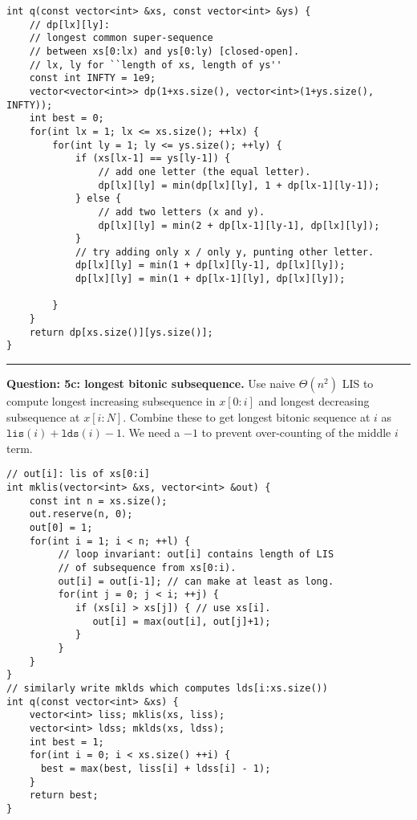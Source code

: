 \documentclass[14pt]{report}
\newcommand*{\question}[1]{\leavevmode\clearpage \par\noindent\rule{\textwidth}{0.4pt} \textbf{Question: #1.}}
\begin{document}
\begin{verbatim}
int q(const vector<int> &xs, const vector<int> &ys) {
    // dp[lx][ly]:
    // longest common super-sequence
    // between xs[0:lx) and ys[0:ly) [closed-open].
    // lx, ly for ``length of xs, length of ys''
    const int INFTY = 1e9;
    vector<vector<int>> dp(1+xs.size(), vector<int>(1+ys.size(), INFTY));
    int best = 0;
    for(int lx = 1; lx <= xs.size(); ++lx) {
        for(int ly = 1; ly <= ys.size(); ++ly) {
            if (xs[lx-1] == ys[ly-1]) {
                // add one letter (the equal letter).
                dp[lx][ly] = min(dp[lx][ly], 1 + dp[lx-1][ly-1]);
            } else {
                // add two letters (x and y).
                dp[lx][ly] = min(2 + dp[lx-1][ly-1], dp[lx][ly]);
            }
            // try adding only x / only y, punting other letter.
            dp[lx][ly] = min(1 + dp[lx][ly-1], dp[lx][ly]);
            dp[lx][ly] = min(1 + dp[lx-1][ly], dp[lx][ly]);

        }
    }
    return dp[xs.size()][ys.size()];
}
\end{verbatim}


\question{5c: longest bitonic subsequence}
Use naive $\Theta(n^2)$ LIS to compute longest increasing
subsequence in $x[0:i]$ and longest decreasing subsequence
at $x[i:N]$. Combine these to get longest bitonic
sequence at $i$ as $\texttt{lis}(i) + \texttt{lds}(i) - 1$.
We need a $-1$ to prevent over-counting of the middle $i$ term.

\begin{verbatim}
// out[i]: lis of xs[0:i]
int mklis(vector<int> &xs, vector<int> &out) {
    const int n = xs.size();
    out.reserve(n, 0);
    out[0] = 1;
    for(int i = 1; i < n; ++l) {
         // loop invariant: out[i] contains length of LIS
         // of subsequence from xs[0:i).
         out[i] = out[i-1]; // can make at least as long.
         for(int j = 0; j < i; ++j) {
            if (xs[i] > xs[j]) { // use xs[i].
               out[i] = max(out[i], out[j]+1);
            }
         }
    }
}
// similarly write mklds which computes lds[i:xs.size())
int q(const vector<int> &xs) {
    vector<int> liss; mklis(xs, liss);
    vector<int> ldss; mklds(xs, ldss);
    int best = 1;
    for(int i = 0; i < xs.size() ++i) {
      best = max(best, liss[i] + ldss[i] - 1);
    }
    return best;
}
\end{verbatim}
\end{document}
